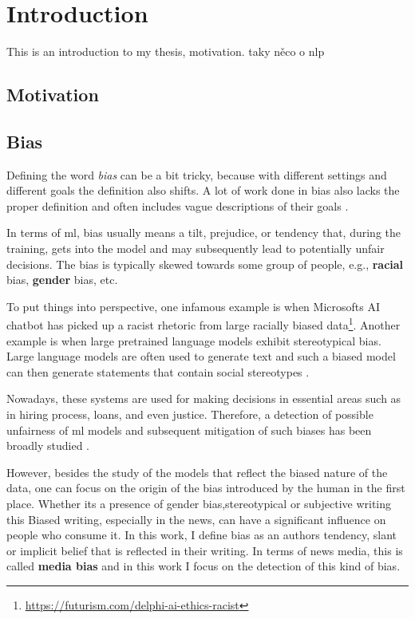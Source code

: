 \chapter{Introduction}
This is an introduction to my thesis, motivation. taky něco o nlp
\section{Motivation}

\section{Bias}
Defining the word \textit{bias} can be a bit tricky, because with different settings and different goals the definition also shifts. A lot of work done in bias also lacks the proper definition and often includes vague descriptions of their goals \cite{blodgett2020language}. 

In terms of \Gls{ml}, bias usually means a tilt, prejudice, or tendency that, during the training, gets into the model and may subsequently lead to potentially unfair decisions. The bias is typically skewed towards some group of people, e.g., \textbf{racial} bias, \textbf{gender} bias, etc. 

To put things into perspective, one infamous example is when Microsofts AI chatbot has picked up a racist rhetoric from large racially biased data\footnote{\url{https://futurism.com/delphi-ai-ethics-racist}}. Another example is when large pretrained language models exhibit stereotypical bias. Large language models are often used to generate text and such a biased model can then generate statements that contain social stereotypes \cite{nadeem2021stereoset}.

Nowadays, these systems are used for making decisions in essential areas such as in hiring process, loans, and even justice. Therefore, a detection of possible unfairness of \Gls{ml} models and subsequent mitigation of such biases has been broadly studied \cite{blodgett2020language}.

However, besides the study of the models that reflect the biased nature of the data, one can focus on the origin of the bias introduced by the human in the first place.
Whether its a presence of gender bias,stereotypical or subjective writing this 
Biased writing, especially in the news, can have a significant influence on people who consume it. In this work, I define bias as an authors tendency, slant or implicit belief that is reflected in their writing. In terms of news media, this is called \textbf{media bias} and in this work I focus on the detection of this kind of bias.

